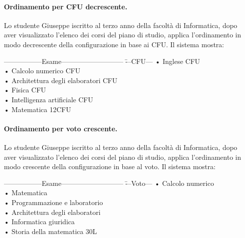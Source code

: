 \paragraph{Ordinamento per CFU decrescente.}
Lo studente Giuseppe iscritto al terzo anno della facoltà di Informatica, dopo aver visualizzato l'elenco dei corsi del piano di studio, applica l'ordinamento in modo decrescente della configurazione in base ai CFU. Il sistema mostra:
\begin{tabbing}
	\hspace{1cm}-----------------Esame--------------------------- \= ---CFU--- \kill
	\hspace{1cm} • Inglese  CFU\\
	\hspace{1cm} • Calcolo numerico   CFU\\
	\hspace{1cm} • Architettura degli elaboratori  CFU\\
	\hspace{1cm} • Fisica  CFU\\
	\hspace{1cm} • Intelligenza artificiale  CFU\\
	\hspace{1cm} • Matematica \> 12CFU\\
\end{tabbing}


\paragraph{Ordinamento per voto crescente.}
Lo studente Giuseppe iscritto al terzo anno della facoltà di Informatica, dopo aver visualizzato l'elenco dei corsi del piano di studio, applica l'ordinamento in modo crescente della configurazione in base al voto. Il sistema mostra:
\begin{tabbing}
	\hspace{1cm}-----------------Esame--------------------------- \= ---Voto--- \kill
	\hspace{1cm} • Calcolo numerico \\
	\hspace{1cm} • Matematica   \\
	\hspace{1cm} • Programmazione e laboratorio \\
	\hspace{1cm} • Architettura degli elaboratori \\
	\hspace{1cm} • Informatica giuridica \\
	\hspace{1cm} • Storia della matematica \> 30L\\
\end{tabbing}

